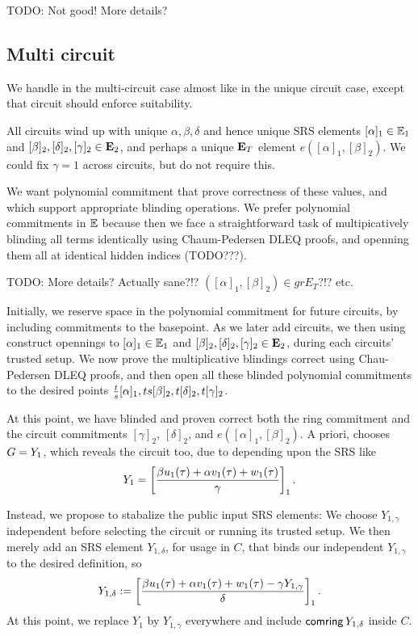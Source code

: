 TODO: Not good!  More details?


\subsection{Multi circuit}

We handle \comring in the multi-circuit case almost like in the
unique circuit case, except that circuit should enforce \comring
suitability. 

All circuits wind up with unique $\alpha,\beta,\delta$ and
hence unique SRS elements $[\alpha]_1 \in {\mathbb{E}}_1$ and
 $[\beta]_2, [\delta]_2, [\gamma]_2 \in {\mathbf{E}}_2$,
and perhaps a unique ${\mathbf{E}}_T$ element $e([\alpha]_1, [\beta]_2)$.
We could fix $\gamma=1$ across circuits, but do not require this.

We want polynomial commitment \cite{KZG} that prove correctness
of these values, and which support appropriate blinding operations. 
We prefer polynomial commitments in ${\mathbb{E}}$ because then
we face a straightforward task of multipicatively blinding
all terms identically using Chaum-Pedersen DLEQ proofs,
and openning them all at identical hidden indices (TODO???).

TODO: More details?  Actually sane?!?  $([\alpha]_1, [\beta]_2) \in grE_T$?!?  etc.

Initially, we reserve space in the polynomial commitment for future
circuits, by including commitments to the basepoint.
As we later add circuits, we then using \cite{aSVC} construct opennings to
$[\alpha]_1 \in {\mathbb{E}}_1$ and $[\beta]_2, [\delta]_2, [\gamma]_2 \in {\mathbf{E}}_2$,
 during each circuits' trusted setup.
We now prove the multiplicative blindings correct using Chau-Pedersen
DLEQ proofs, and then open all these blinded polynomial commitments
to the desired points
 ${t \over s} [\alpha]_1, t s [\beta]_2, t [\delta]_2, t [\gamma]_2$.


At this point, we have blinded and proven correct both the
ring commitment \comring and the circuit commitments $[\gamma]_2$,
$[\delta]_2$, and $e([\alpha]_1, [\beta]_2)$.
A priori, \pifast chooses $G = Y_1$, which reveals the circuit too,
due to depending upon the SRS like
$$ Y_1 = \left[ {\beta u_1(\tau) + \alpha v_1(\tau) + w_1(\tau) \over \gamma} \right]_1 . $$

Instead, we propose to stabalize the public input SRS elements:
We choose $Y_{1,\gamma}$ independent before selecting the circuit
 or running its trusted setup.
We then merely add an SRS element $Y_{1,\delta}$, for usage in $C$, that binds
 our independent $Y_{1,\gamma}$ to the desired definition, so
$$ Y_{1,\delta} := \left[ {\beta u_1(\tau) + \alpha v_1(\tau) + w_1(\tau) - \gamma Y_{1,\gamma} \over \delta} \right]_1 . $$
At this point, we replace $Y_1$ by $Y_{1,\gamma}$ everywhere and
 include $\mathsf{comring} \, Y_{1,\delta}$ inside $C$.


